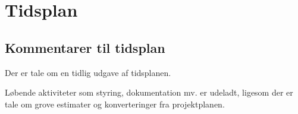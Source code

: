\section{Tidsplan}
\clearpage
\subsection{Kommentarer til tidsplan}
Der er tale om en tidlig udgave af tidsplanen.

Løbende aktiviteter som styring, dokumentation mv. er udeladt, ligesom der er tale om grove estimater og konverteringer fra projektplanen.